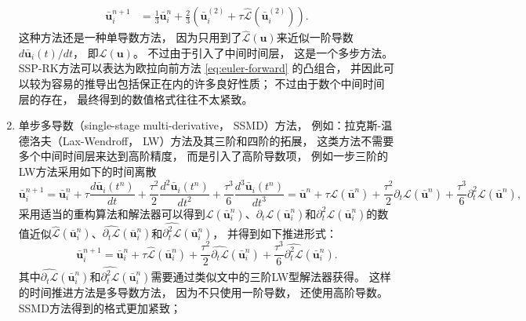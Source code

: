 \begin{enumerate}
\begin{align}
          \bar{\bm{u}}_i^{n+1} & = \frac{1}{3} \bar{\bm{u}}_i^n + \frac{2}{3} \left(\bar{\bm{u}}_i^{(2)} + \tau \hat{\mathcal{L}}(\bar{\bm{u}}_i^{(2)})\right).
        \end{align}
        这种方法还是一种单导数方法，
        因为只用到了$\hat{\mathcal{L}}({\bm{u}})$来近似一阶导数${d \bar{\bm{u}}_i(t)}/{dt}$，
        即$\mathcal{L}({\bm{u}})$。
        不过由于引入了中间时间层，
        这是一个多步方法。
        SSP-RK方法可以表达为欧拉向前方法 \cref{eq:euler-forward} 的凸组合，
        并因此可以较为容易的推导出包括保正在内的许多良好性质；
        不过由于数个中间时间层的存在，
        最终得到的数值格式往往不太紧致。
  \item 单步多导数（single-stage multi-derivative，
        SSMD）方法，
        例如：拉克斯-温德洛夫（Lax-Wendroff，
        LW）方法及其三阶和四阶的拓展，
        这类方法不需要多个中间时间层来达到高阶精度，
        而是引入了高阶导数项，
        例如一步三阶的LW方法采用如下的时间离散
        \begin{equation}
          \bar{\bm{u}}_i^{n+1} = \bar{\bm{u}}_i^{n} + \tau \frac{d \bar{\bm{u}}_i(t^n)}{dt} + \frac{\tau^2}{2} \frac{d^2 \bar{\bm{u}}_i(t^n)}{dt^2} + \frac{\tau^3}{6} \frac{d^3 \bar{\bm{u}}_i(t^n)}{dt^3} = \bar{\bm{u}}^n + \tau \mathcal{L}(\bar{\bm{u}}^{n}) + \frac{\tau^2}{2} {\partial_t}\mathcal{L}(\bar{\bm{u}}^{n}) + \frac{\tau^3}{6} {\partial_t^2}\mathcal{L}(\bar{\bm{u}}^{n}),
        \end{equation}
        采用适当的重构算法和解法器可以得到$\mathcal{L}(\bar{\bm{u}}_i^n)$、${\partial_t}\mathcal{L}(\bar{\bm{u}}_i^n)$和${\partial_t^2}\mathcal{L}(\bar{\bm{u}}_i^n)$的数值近似$\hat{\mathcal{L}}(\bar{\bm{u}}_i^n)$、$\widehat{{\partial_t}\mathcal{L}}(\bar{\bm{u}}_i^n)$和$\widehat{{\partial_t^2}\mathcal{L}}(\bar{\bm{u}}_i^n)$，
        并得到如下推进形式：
        \begin{equation}
          \bar{\bm{u}}_i^{n+1} = \bar{\bm{u}}_i^n + \tau \hat{\mathcal{L}}(\bar{\bm{u}}_i^{n}) + \frac{\tau^2}{2} \widehat{{\partial_t}\mathcal{L}}(\bar{\bm{u}}_i^{n}) + \frac{\tau^3}{6} \widehat{{\partial_t^2}\mathcal{L}}(\bar{\bm{u}}_i^n).
        \end{equation}
        其中$\widehat{{\partial_t}\mathcal{L}}(\bar{\bm{u}}_i^n)$和$\widehat{{\partial_t^2}\mathcal{L}}(\bar{\bm{u}}_i^n)$需要通过类似文\cite{Qiu-Shu-2003,Qian,Yang}中的三阶LW型解法器获得。
        这样的时间推进方法是多导数方法，
        因为不只使用一阶导数，
        还使用高阶导数。
        SSMD方法得到的格式更加紧致；

\end{enumerate}
